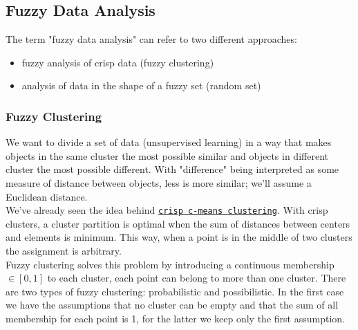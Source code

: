 \subsection{Fuzzy Data Analysis}

The term "fuzzy data analysis" can refer to two different approaches:
\begin{itemize}
	\item fuzzy analysis of crisp data (fuzzy clustering)
	\item analysis of data in the shape of a fuzzy set (random set)
\end{itemize}

\subsubsection{Fuzzy Clustering}
We want to divide a set of data (unsupervised learning) in a way that makes objects in the same cluster the most possible similar and objects in different cluster the most possible different. With "difference" being interpreted as some measure of distance between objects, less is more similar; we'll assume a Euclidean distance.\\

We've already seen the idea behind \hyperref[point:c-means]{\texttt{crisp c-means clustering}}. With crisp clusters, a cluster partition is optimal when the sum of distances between centers and elements is minimum. This way, when a point is in the middle of two clusters the assignment is arbitrary.\\
Fuzzy clustering solves this problem by introducing a continuous membership $\in [0,1]$ to each cluster, each point can belong to more than one cluster. There are two types of fuzzy clustering: probabilistic and possibilistic. In the first case we have the assumptions that no cluster can be empty and that the sum of all membership for each point is 1, for the latter we keep only the first assumption.\\

